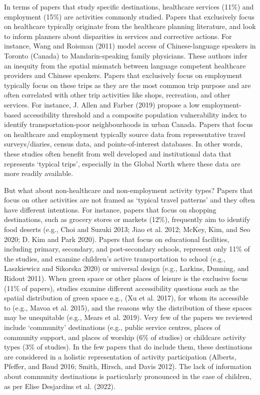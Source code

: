\documentclass[12pt, oneside]{report}
\begin{document}
In terms of papers that study specific destinations, healthcare services
(11\%) and employment (15\%) are activities commonly studied. Papers
that exclusively focus on healthcare typically originate from the
healthcare planning literature, and look to inform planners about
disparities in services and corrective actions. For instance, Wang and
Roisman (2011) model access of Chinese-language speakers in Toronto
(Canada) to Mandarin-speaking family physicians. These authors infer an
inequity from the spatial mismatch between language competent healthcare
providers and Chinese speakers. Papers that exclusively focus on
employment typically focus on these trips as they are the most common
trip purpose and are often correlated with other trip activities like
shops, recreation, and other services. For instance, J. Allen and Farber
(2019) propose a low employment-based accessibility threshold and a
composite population vulnerability index to identify transportation-poor
neighbourhoods in urban Canada. Papers that focus on healthcare and
employment typically source data from representative travel
surveys/diaries, census data, and points-of-interest databases. In other
words, these studies often benefit from well developed and institutional
data that represents `typical trips', especially in the Global North
where these data are more readily available.

But what about non-healthcare and non-employment activity types? Papers
that focus on other activities are not framed as `typical travel
patterns' and they often have different intentions. For instance, papers
that focus on shopping destinations, such as grocery stores or markets
(12\%), frequently aim to identify food deserts (e.g., Choi and Suzuki
2013; Jiao et al. 2012; McKey, Kim, and Seo 2020; D. Kim and Park 2020).
Papers that focus on educational facilities, including primary,
secondary, and post-secondary schools, represent only 11\% of the
studies, and examine children's active transportation to school (e.g.,
Laszkiewicz and Sikorska 2020) or universal design (e.g., Larkins,
Dunning, and Ridout 2011). When green space or other places of leisure
is the exclusive focus (11\% of papers), studies examine different
accessibility questions such as the spatial distribution of green space
e.g., (Xu et al. 2017), for whom its accessible to (e.g., Mavoa et al.
2015), and the reasons why the distribution of these spaces may be
unequitable (e.g., Mears et al. 2019). Very few of the papers we
reviewed include `community' destinations (e.g., public service centres,
places of community support, and places of worship (6\% of studies) or
childcare activity types (3\% of studies). In the few papers that do
include them, these destinations are considered in a holistic
representation of activity participation (Alberts, Pfeffer, and Baud
2016; Smith, Hirsch, and Davis 2012). The lack of information about
community destinations is particularly pronounced in the case of
children, as per Elise Desjardins et al. (2022).
\end{document}
